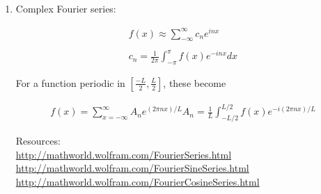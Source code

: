 \documentclass[11pt]{article}
\begin{document}
\begin{enumerate}
\item 

Complex Fourier series:

\begin{align*}
     f(x) \approx \sum_{-\infty}^{\infty} c_{n}e^{inx} \\\\
     c_{n} = \frac{1}{2 \pi} \int_{-\pi}^{\pi} f(x) e^{-inx}dx
\end{align*}


For a function periodic in $[\frac{-L}{2},\frac{L}{2}]$, these become

\begin{align*}
    f(x) = \sum_{x= -\infty}^{\infty} A_{n}e^{(2 \pi n x)/L}
    A_{n} = \frac{1}{L}\int_{-L/2}^{L/2} f(x) e^{-i(2 \pi n x)/L}
\end{align*}


Resources:\\
\url{http://mathworld.wolfram.com/FourierSeries.html}\\
\url{http://mathworld.wolfram.com/FourierSineSeries.html}\\
\url{http://mathworld.wolfram.com/FourierCosineSeries.html}


\end{enumerate}
\end{document}
